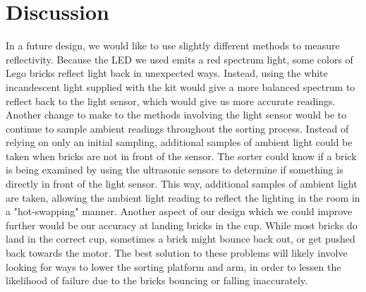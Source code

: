 \documentclass{article}
\begin{document}
\section{Discussion}

In a future design, we would like to use slightly different methods to measure reflectivity. Because the LED we used emits a red spectrum light, some colors of Lego bricks reflect light back in unexpected ways. Instead, using the white incandescent light supplied with the kit would give a more balanced spectrum to reflect back to the light sensor, which would give us more accurate readings. Another change to make to the methods involving the light sensor would be to continue to sample ambient readings throughout the sorting process. Instead of relying on only an initial sampling, additional samples of ambient light could be taken when bricks are not in front of the sensor. The sorter could know if a brick is being examined by using the ultrasonic sensors to determine if something is directly in front of the light sensor. This way, additional samples of ambient light are taken, allowing the ambient light reading to reflect the lighting in the room in a "hot-swapping" manner. Another aspect of our design which we could improve further would be our accuracy at landing bricks in the cup. While most bricks do land in the correct cup, sometimes a brick might bounce back out, or get pushed back towards the motor. The best solution to these problems will likely involve looking for ways to lower the sorting platform and arm, in order to lessen the likelihood of failure due to the bricks bouncing or falling inaccurately.  
\end{document}
